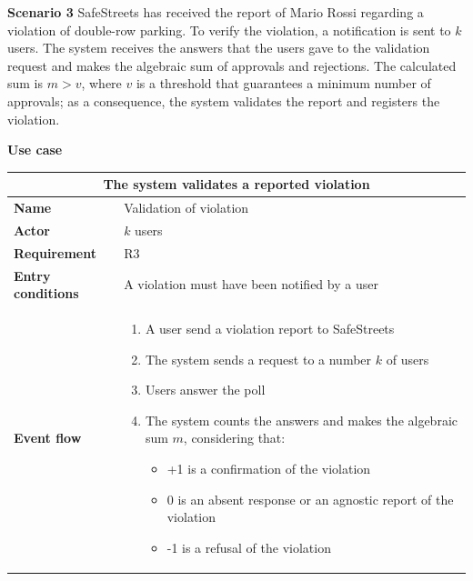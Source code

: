 \begin{description}
    \item \textbf{Scenario 3} \newline
        SafeStreets has received the report of Mario Rossi regarding a violation of double-row parking. To verify the violation, a notification is sent to $k$ users. The system receives the answers that the users gave to the validation request and makes the algebraic sum of approvals and rejections. The calculated sum is $m > v$, where $v$ is a threshold that guarantees a minimum number of approvals; as a consequence, the system validates the report and registers the violation.

    \item \textbf{Use case}
        \begin{center}
            \begin{tabular}{|p{3cm}|p{7cm}|}
                \multicolumn{2}{c}{\textbf{The system validates a reported violation}} \\
                \hline
                \textbf{Name} & Validation of violation  \\
                \hline
                \textbf{Actor} & $k$ users \\
                \hline
                \textbf{Requirement} & R3 \\
                \hline
                \textbf{Entry conditions} & A violation must have been notified by a user \\
                \hline
                \textbf{Event flow} &
                \begin{enumerate}
                    \item A user send a violation report to SafeStreets
                    \item The system sends a request to a number $k$ of users
                    \item Users answer the poll
                    \item The system counts the answers and makes the algebraic sum $m$, considering that:
                    \begin{itemize}
                        \item +1 is a confirmation of the violation
                        \item 0 is an absent response or an agnostic report of the violation
                        \item -1 is a refusal of the violation 
                    \end{itemize}

\end{enumerate}
\end{tabular}
\end{center}
\end{description}
